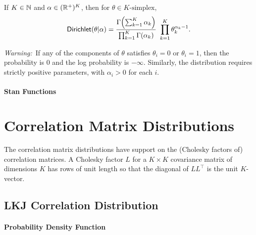 If $K \in \nats$ and $\alpha \in (\posreals)^{K}$, then for
$\theta \in \mbox{$K$-simplex}$, 
\[
\distro{Dirichlet}(\theta|\alpha)
= 
\frac{\Gamma \! \left( \sum_{k=1}^K \alpha_k \right)}
     {\prod_{k=1}^K \Gamma(\alpha_k)}
\
\prod_{k=1}^K \theta_k^{\alpha_k - 1}
.
\]

{\it Warning:}\ If any of the components of $\theta$ satisfies
$\theta_i = 0$ or $\theta_i = 1$, then the probability is 0 and the log
probability is $-\infty$.  Similarly, the distribution requires
strictly positive parameters, with $\alpha_i > 0$ for each $i$.



\subsubsection{Stan Functions}

\begin{description}
\end{description}
%
\begin{description}
\end{description}


\chapter{Correlation Matrix Distributions}

\noindent
The correlation matrix distributions have support on the (Cholesky
factors of) correlation matrices.  A Cholesky factor $L$ for a $K
\times K$ covariance matrix of dimensions $K$ has rows of unit length
so that the diagonal of $L L^{\top}$ is the unit $K$-vector.


\section{LKJ Correlation Distribution}\label{lkj-correlation.section}

\subsubsection{Probability Density Function}

